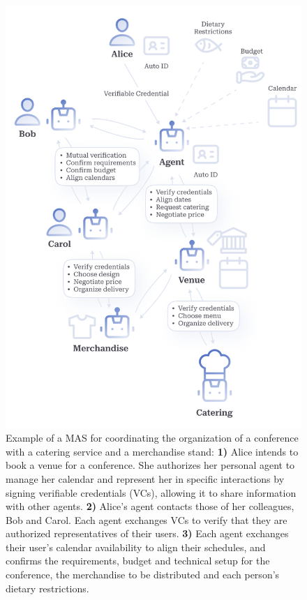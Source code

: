 \documentclass[conference]{IEEEtran}
\begin{document}
\begin{figure}
    \centering
    \includegraphics[width=1\linewidth]{multi-agent-system.png}
    \caption{Example of a MAS for coordinating the organization of a conference with a catering service and a merchandise stand:
    \textbf{1)} Alice intends to book a venue for a conference. She authorizes her personal agent to manage her calendar and represent her in specific interactions by signing verifiable credentials (VCs), allowing it to share information with other agents.
\textbf{2)} Alice's agent contacts those of her colleagues, Bob and Carol. Each agent exchanges VCs to verify that they are authorized representatives of their users.
\textbf{3)} Each agent exchanges their user's calendar availability to align their schedules, and confirms the requirements, budget and technical setup for the conference, the merchandise to be distributed and each person's dietary restrictions.
}
\end{figure}
\end{document}
